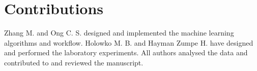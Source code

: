 \documentclass{article}
\begin{document}
\section{Contributions}
Zhang M. and Ong C. S. designed and implemented the machine learning algorithms and workflow. Holowko M. B. and Hayman Zumpe H. have designed and performed the laboratory experiments. All authors analysed the data and contributed to and reviewed the manuscript.


\newpage

\printbibliography

\clearpage

\appendix

\end{document}
